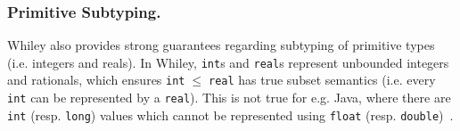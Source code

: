\subsubsection{Primitive Subtyping.} 
Whiley also provides strong guarantees regarding subtyping of
primitive types (i.e. integers and reals).  In Whiley,
\lstinline{int}s and \lstinline{real}s represent unbounded integers
and rationals, which ensures \lstinline{int}$\;\le\;$\lstinline{real}
has true subset semantics (i.e. every \lstinline{int} can be
represented by a \lstinline{real}).  This is not true for e.g. Java,
where there are \lstinline{int} (resp. \lstinline{long}) values which
cannot be represented using \lstinline{float}
(resp. \lstinline{double})~\cite[\S5.1.2]{GJSB05}.


